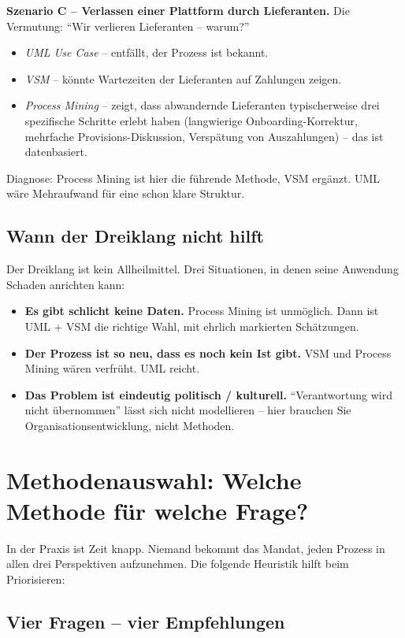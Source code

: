 \documentclass[11pt,a4paper,oneside]{article}
\newcommand{\fachbegriff}[1]{\textbf{#1}}
\begin{document}
\textbf{Szenario C -- Verlassen einer Plattform durch Lieferanten.} Die Vermutung: ``Wir verlieren Lieferanten -- warum?''
\begin{itemize}
  \item \emph{UML Use Case} -- entfällt, der Prozess ist bekannt.
  \item \emph{VSM} -- könnte Wartezeiten der Lieferanten auf Zahlungen zeigen.
  \item \emph{Process Mining} -- zeigt, dass abwandernde Lieferanten typischerweise drei spezifische Schritte erlebt haben (langwierige Onboarding-Korrektur, mehrfache Provisions-Diskussion, Verspätung von Auszahlungen) -- das ist datenbasiert.
\end{itemize}
Diagnose: Process Mining ist hier die führende Methode, VSM ergänzt. UML wäre Mehraufwand für eine schon klare Struktur.

\subsection{Wann der Dreiklang nicht hilft}

Der Dreiklang ist kein Allheilmittel. Drei Situationen, in denen seine Anwendung Schaden anrichten kann:

\begin{itemize}
  \item \fachbegriff{Es gibt schlicht keine Daten.} Process Mining ist unmöglich. Dann ist UML + VSM die richtige Wahl, mit ehrlich markierten Schätzungen.
  \item \fachbegriff{Der Prozess ist so neu, dass es noch kein Ist gibt.} VSM und Process Mining wären verfrüht. UML reicht.
  \item \fachbegriff{Das Problem ist eindeutig politisch / kulturell.} ``Verantwortung wird nicht übernommen'' lässt sich nicht modellieren -- hier brauchen Sie Organisationsentwicklung, nicht Methoden.
\end{itemize}

\section{Methodenauswahl: Welche Methode für welche Frage?}

In der Praxis ist Zeit knapp. Niemand bekommt das Mandat, jeden Prozess in allen drei Perspektiven aufzunehmen. Die folgende Heuristik hilft beim Priorisieren:

\subsection{Vier Fragen -- vier Empfehlungen}
\end{document}
